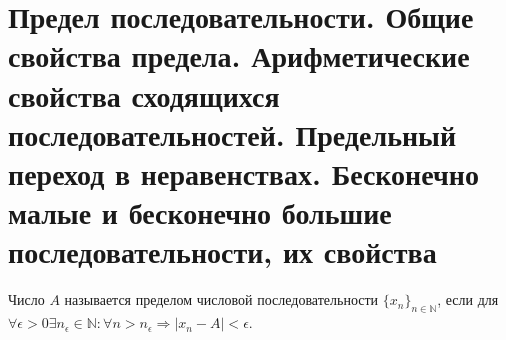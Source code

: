 \section{Предел последовательности. Общие свойства предела. Арифметические свойства сходящихся последовательностей. Предельный переход в неравенствах. Бесконечно малые и бесконечно большие последовательности, их свойства}

\begin{definition}
	Число $A$ называется пределом числовой последовательности $\{x_n\}_{n \in \mathbb{N}}$, если для $\forall \epsilon > 0 \exists n_\epsilon \in \mathbb{N}: \forall n > n_{\epsilon} \Rightarrow |x_n - A| < \epsilon$.
\end{definition}